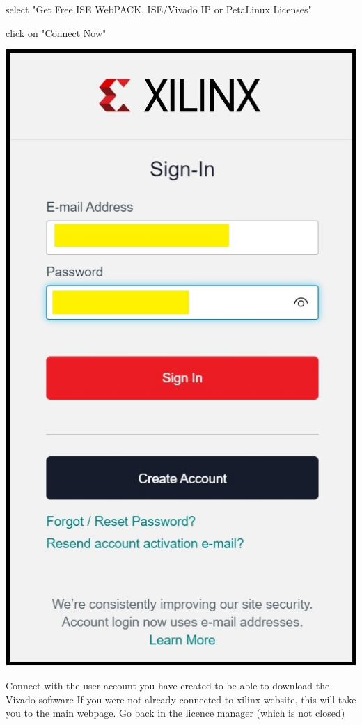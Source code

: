 select "Get Free ISE WebPACK, ISE/Vivado IP or PetaLinux Licenses"

click on "Connect Now"

\includegraphics[width=\linewidth]{images/VivadoInstimg024.jpg}

Connect with the user account you have created to be able to download the Vivado software
If you were not already connected to xilinx website, this will take you to the main webpage.
Go back in the licence manager (which is not closed)

